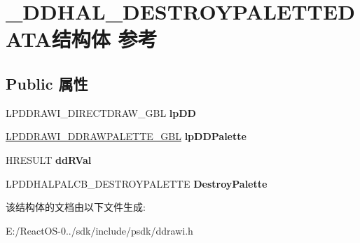 \hypertarget{struct___d_d_h_a_l___d_e_s_t_r_o_y_p_a_l_e_t_t_e_d_a_t_a}{}\section{\+\_\+\+D\+D\+H\+A\+L\+\_\+\+D\+E\+S\+T\+R\+O\+Y\+P\+A\+L\+E\+T\+T\+E\+D\+A\+T\+A结构体 参考}
\label{struct___d_d_h_a_l___d_e_s_t_r_o_y_p_a_l_e_t_t_e_d_a_t_a}
\subsection*{Public 属性}
\begin{DoxyCompactItemize}
\item 
\mbox{\label{struct___d_d_h_a_l___d_e_s_t_r_o_y_p_a_l_e_t_t_e_d_a_t_a_a3dd1fc19bd2c28493738f2178cffab57}} 
L\+P\+D\+D\+R\+A\+W\+I\+\_\+\+D\+I\+R\+E\+C\+T\+D\+R\+A\+W\+\_\+\+G\+BL {\bfseries lp\+DD}
\item 
\mbox{\label{struct___d_d_h_a_l___d_e_s_t_r_o_y_p_a_l_e_t_t_e_d_a_t_a_a816be6ab2b664b22e7fa36044c79f334}} 
\hyperlink{struct___d_d_r_a_w_i___d_d_r_a_w_p_a_l_e_t_t_e___g_b_l}{L\+P\+D\+D\+R\+A\+W\+I\+\_\+\+D\+D\+R\+A\+W\+P\+A\+L\+E\+T\+T\+E\+\_\+\+G\+BL} {\bfseries lp\+D\+D\+Palette}
\item 
\mbox{\label{struct___d_d_h_a_l___d_e_s_t_r_o_y_p_a_l_e_t_t_e_d_a_t_a_a9567bfb0bc036839b6c71738acaab36e}} 
H\+R\+E\+S\+U\+LT {\bfseries dd\+R\+Val}
\item 
\mbox{\label{struct___d_d_h_a_l___d_e_s_t_r_o_y_p_a_l_e_t_t_e_d_a_t_a_ae330471a27586b70a63027497efc6714}} 
L\+P\+D\+D\+H\+A\+L\+P\+A\+L\+C\+B\+\_\+\+D\+E\+S\+T\+R\+O\+Y\+P\+A\+L\+E\+T\+TE {\bfseries Destroy\+Palette}
\end{DoxyCompactItemize}


该结构体的文档由以下文件生成\+:\begin{DoxyCompactItemize}
\item 
E\+:/\+React\+O\+S-\/0../sdk/include/psdk/ddrawi.\+h\end{DoxyCompactItemize}
